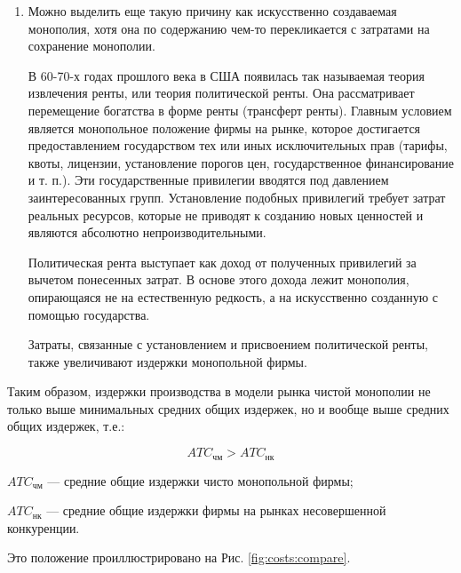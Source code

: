 \documentclass[12pt]{article}
\begin{document}
\begin{enumerate}
        \item Можно выделить еще такую причину как искусственно создаваемая монополия, хотя она по содержанию чем-то перекликается с затратами на сохранение монополии.

        В 60-70-х годах прошлого века в США появилась так называемая теория извлечения ренты, или теория политической ренты. Она рассматривает перемещение богатства в форме ренты (трансферт ренты). Главным условием является монопольное положение фирмы на рынке, которое достигается предоставлением государством тех или иных исключительных прав (тарифы, квоты, лицензии, установление порогов цен, государственное финансирование и т. п.). Эти государственные привилегии вводятся под давлением заинтересованных групп. Установление подобных привилегий требует затрат реальных ресурсов, которые не приводят к созданию новых ценностей и являются абсолютно непроизводительными.

        Политическая рента выступает как доход от полученных привилегий за вычетом понесенных затрат. В основе этого дохода лежит монополия, опирающаяся не на естественную редкость, а на искусственно созданную с помощью государства.

        Затраты, связанные с установлением и присвоением политической ренты, также увеличивают издержки монопольной фирмы.
    \end{enumerate}

    Таким образом, издержки производства в модели рынка чистой монополии не только выше минимальных средних общих издержек, но и вообще выше средних общих издержек, т.е.:

    $$ ATC_{\text{чм}} > ATC_{\text{нк}}$$

    $ATC_{\text{чм}}$ --- средние общие издержки чисто монопольной фирмы;

    $ATC_{\text{нк}}$ --- средние общие издержки фирмы на рынках несовершенной конкуренции.

    Это положение проиллюстрировано на Рис. \ref{fig:costs:compare}.
\end{document}
